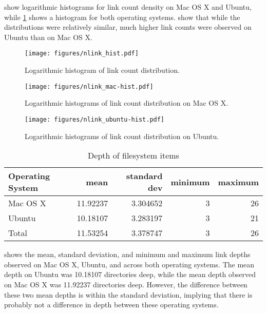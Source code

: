 \documentclass[12pt,letterpaper]{article}
\begin{document}
		 show logarithmic histograms for link count density on Mac OS X and Ubuntu, while \cref{fig:nlink_hist} shows a histogram for both operating systems.  show that while the distributions were relatively similar, much higher link counts were observed on Ubuntu than on Mac OS X.

		\begin{figure}[H]
			\centerline{\texttt{[image: figures/nlink\_hist.pdf]}}
			\caption{Logarithmic histogram of link count distribution.}
			\label{fig:nlink_hist}
		\end{figure}

		\begin{figure}[H]
			\centerline{\texttt{[image: figures/nlink\_mac-hist.pdf]}}
			\caption{Logarithmic histograms of link count distribution on Mac OS X.}
			\label{fig:nlink_mac-hist}
		\end{figure}

		\begin{figure}[H]
			\centerline{\texttt{[image: figures/nlink\_ubuntu-hist.pdf]}}
			\caption{Logarithmic histograms of link count distribution on Ubuntu.}
			\label{fig:nlink_ubuntu-hist}
		\end{figure}


		\begin{table}[h]
		\centering
		\caption{Depth of filesystem items}
		\label{table:depth}
			\begin{tabular}{l r r r r}
			Operating System & mean  & standard dev & minimum & maximum \\
			\hline
			Mac OS X & 11.92237 & 3.304652 & 3  & 26 \\
			Ubuntu &  10.18107 & 3.283197 & 3 & 21 \\
			Total & 11.53254 & 3.378747 & 3 & 26 \\
			\end{tabular}
		\end{table}

			 shows the mean, standard deviation, and minimum and maximum link depths observed on Mac OS X, Ubuntu, and across both operating systems. The mean depth on Ubuntu was 10.18107 directories deep, while the mean depth observed on Mac OS X was 11.92237 directories deep. However, the difference between these two mean depths is within the standard deviation, implying that there is probably not a difference in depth between these operating systems.
\end{document}
